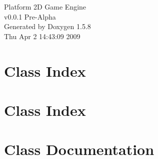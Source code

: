 \documentclass[a4paper]{book}
\begin{document}
\begin{titlepage}
\vspace*{7cm}
\begin{center}
{\Large Platform 2D Game Engine \\[1ex]\large v0.0.1 Pre-Alpha }\\
\vspace*{1cm}
{\large Generated by Doxygen 1.5.8}\\
\vspace*{0.5cm}
{\small Thu Apr 2 14:43:09 2009}\\
\end{center}
\end{titlepage}
\clearemptydoublepage
{}
\tableofcontents
\clearemptydoublepage
{}
\chapter{Class Index}

\chapter{Class Index}

\chapter{Class Documentation}





\printindex
\end{document}
